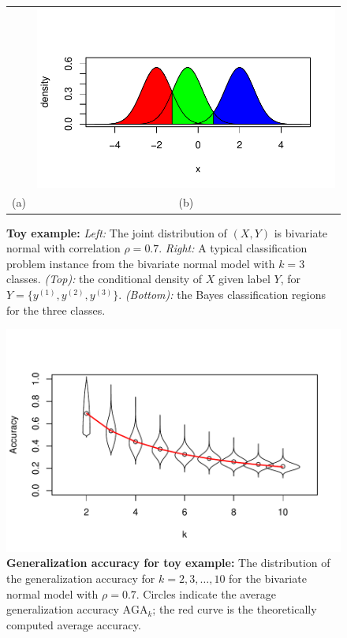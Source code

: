\documentclass[twoside,11pt]{article}
\begin{document}
\begin{figure}[p]
\begin{tabular}{cc}
 &  \includegraphics[scale = 0.5, clip = true, trim = 0 0 0 0.5in]{illus_example1b.pdf}\\
(a) & (b)
\end{tabular}

\caption{\textbf{Toy example:}
\emph{Left:} The joint distribution of $(X, Y)$ is bivariate normal with correlation $\rho = 0.7$.
\emph{Right:} A typical classification problem instance from the bivariate normal model with $k = 3$ classes.
\emph{(Top):} the conditional density of $X$ given label $Y$, for $Y = \{y^{(1)}, y^{(2)}, y^{(3)}\}$.
\emph{(Bottom):} the Bayes classification regions for the three classes.}\label{fig:toy1}
\end{figure}

\begin{figure}[p]
\centering
\includegraphics[scale = 0.7, clip = true, trim = 0 0 0 0.5in]{illus_err_0_7.pdf}

\caption{\textbf{Generalization accuracy for toy example:} The distribution of the generalization accuracy
  for $k = 2,3,\hdots, 10$ for the bivariate normal model with $\rho =
  0.7$.  Circles indicate the average generalization accuracy $\text{AGA}_k$; the red
  curve is the theoretically computed average accuracy.}\label{fig:toy2}
\end{figure}
\end{document}
